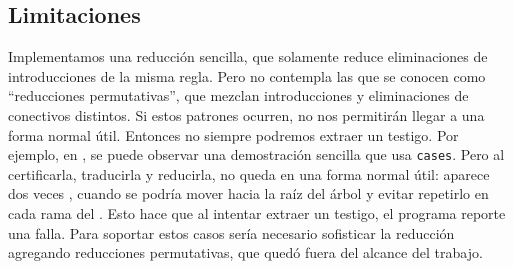 
\subsection{Limitaciones}
\label{fri:norm:sec:limitations}

Implementamos una reducción sencilla, que solamente reduce eliminaciones de introducciones de la misma regla. Pero no contempla las que se conocen como ``reducciones permutativas'', que mezclan introducciones y eliminaciones de conectivos distintos. Si estos patrones ocurren, no nos permitirán llegar a una forma normal útil. Entonces no siempre podremos extraer un testigo. Por ejemplo, en , se puede observar una demostración sencilla que usa \lstinline{cases}. Pero al certificarla, traducirla y reducirla, no queda en una forma normal útil: aparece dos veces , cuando se podría mover hacia la raíz del árbol y evitar repetirlo en cada rama del . Esto hace que al intentar extraer un testigo, el programa reporte una falla. Para soportar estos casos sería necesario sofisticar la reducción agregando reducciones permutativas, que quedó fuera del alcance del trabajo.

